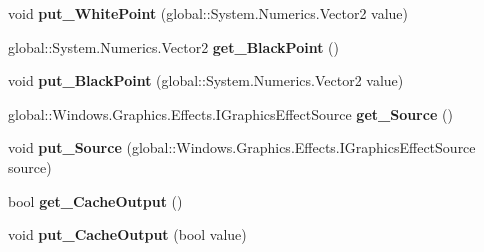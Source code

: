 \begin{DoxyCompactItemize}
\item 
\mbox{\label{class_microsoft_1_1_graphics_1_1_canvas_1_1_effects_1_1_brightness_effect_acedd43ed76b47e67db67b3b351732d75}} 
void {\bfseries put\+\_\+\+White\+Point} (global\+::\+System.\+Numerics.\+Vector2 value)
\item 
\mbox{\label{class_microsoft_1_1_graphics_1_1_canvas_1_1_effects_1_1_brightness_effect_ac7be5f6aa71740a4754dfbdeb1fc3515}} 
global\+::\+System.\+Numerics.\+Vector2 {\bfseries get\+\_\+\+Black\+Point} ()
\item 
\mbox{\label{class_microsoft_1_1_graphics_1_1_canvas_1_1_effects_1_1_brightness_effect_ace38eda2b5d63e091a80c2ca5ce0c214}} 
void {\bfseries put\+\_\+\+Black\+Point} (global\+::\+System.\+Numerics.\+Vector2 value)
\item 
\mbox{\label{class_microsoft_1_1_graphics_1_1_canvas_1_1_effects_1_1_brightness_effect_a7b0bb58e7e2d295dbbf1915014ecf6a7}} 
global\+::\+Windows.\+Graphics.\+Effects.\+I\+Graphics\+Effect\+Source {\bfseries get\+\_\+\+Source} ()
\item 
\mbox{\label{class_microsoft_1_1_graphics_1_1_canvas_1_1_effects_1_1_brightness_effect_a1b63503e02351c27c159def6ef491a70}} 
void {\bfseries put\+\_\+\+Source} (global\+::\+Windows.\+Graphics.\+Effects.\+I\+Graphics\+Effect\+Source source)
\item 
\mbox{\label{class_microsoft_1_1_graphics_1_1_canvas_1_1_effects_1_1_brightness_effect_afc318ab58e1e1689a15fea4fae102922}} 
bool {\bfseries get\+\_\+\+Cache\+Output} ()
\item 
\mbox{\label{class_microsoft_1_1_graphics_1_1_canvas_1_1_effects_1_1_brightness_effect_a6408ed4eabb4d5b57cd49bffe7443269}} 
void {\bfseries put\+\_\+\+Cache\+Output} (bool value)

\end{DoxyCompactItemize}
